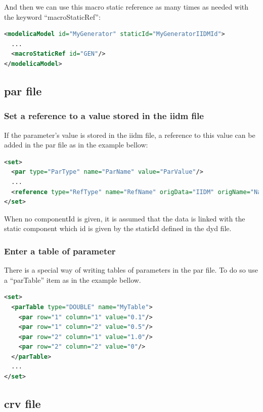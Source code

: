 \documentclass[a4paper, 12pt]{report}
\begin{document}
And then we can use this macro static reference as many times as needed with the keyword ``macroStaticRef'':
\begin{lstlisting}[language=XML, morekeywords={macroStaticRef}]
<modelicaModel id="MyGenerator" staticId="MyGeneratorIIDMId">
  ...
  <macroStaticRef id="GEN"/>
</modelicaModel>
\end{lstlisting}

\subsection{par file}

\subsubsection{Set a reference to a value stored in the iidm file}
\label{sec:Set a reference to a value stored in the iidm file}

If the parameter's value is stored in the iidm file, a reference to this value can be added in the par file as in the example bellow:
\begin{lstlisting}[language=XML, morekeywords={reference}]
<set>
  <par type="ParType" name="ParName" value="ParValue"/>
  ...
  <reference type="RefType" name="RefName" origData="IIDM" origName="NameIIDM" componentId="Model_id_in_iidm_File"/>
</set>
\end{lstlisting}

When no componentId is given, it is assumed that the data is linked with the static component which id is given by the staticId defined in the dyd file.

\subsubsection{Enter a table of parameter}

There is a special way of writing tables of parameters in the par file. To do so use a ``parTable'' item as in the example bellow.
\begin{lstlisting}[language=XML, morekeywords={parTable}]
<set>
  <parTable type="DOUBLE" name="MyTable">
    <par row="1" column="1" value="0.1"/>
    <par row="1" column="2" value="0.5"/>
    <par row="2" column="1" value="1.0"/>
    <par row="2" column="2" value="0"/>
  </parTable>
  ...
</set>
\end{lstlisting}

\subsection{crv file}
\end{document}
